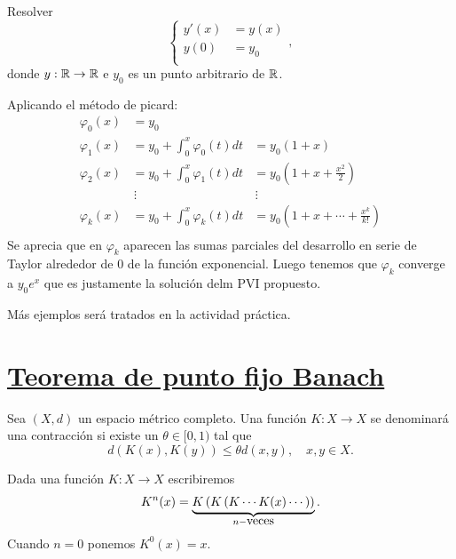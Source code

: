 \begin{ejemplo} Resolver
\[
 \left\{
 \begin{array}{ll}
 y'(x)&=y(x)\\
 y(0)&=y_0\\
 \end{array}
  \right. ,
\]
donde $y:\mathbb{R}\to\mathbb{R}$ e $y_0$ es un punto arbitrario de $\mathbb{R}$.

Aplicando el método de picard:
\[
 \begin{array}{lll}
  \varphi_0(x)&=y_0 &\\
  \varphi_1(x) &= y_0+\int_{0}^x \varphi_0(t)dt &= y_0(1+x)\\
  \varphi_2(x) &= y_0+\int_{0}^x \varphi_1(t)dt &= y_0(1+x+\frac{x^2}{2})\\
               &\,\vdots                        &\,\vdots                 \\
  \varphi_k(x) &= y_0+\int_{0}^x \varphi_k(t)dt &= y_0(1+x+\cdots+\frac{x^k}{k!})\\
 \end{array}
\]
Se aprecia que en $\varphi_k$ aparecen las sumas parciales del desarrollo en serie de Taylor alrededor de $0$ de la función exponencial. Luego tenemos que $\varphi_k$ converge a $y_0e^x$ que es justamente la solución delm PVI propuesto.
\end{ejemplo}

Más ejemplos será tratados en la actividad práctica.

\section{\href{https://es.wikipedia.org/wiki/Teorema_del_punto_fijo_de_Banach}{Teorema de punto fijo Banach}}

\begin{definicion} Sea $(X,d)$ un espacio métrico completo. Una función $K:X\to X$ se denominará una contracción si existe un $\theta\in [0,1)$ tal que
\[d(K(x),K(y))\leq \theta d(x,y),\quad x,y\in X.\]
\end{definicion}

Dada una función $K:X\to X$ escribiremos
\[K^n(x)=\underbrace{K\left( K \left( K\cdots K(x)\cdots \right)\right)}_{n-\hbox{veces}}.\]
Cuando $n=0$ ponemos $K^0(x)=x$.

